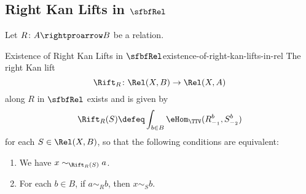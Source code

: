 \subsection{Right Kan Lifts in $\sfbfRel$}\label{subsection-right-kan-lifts-in-rel}
Let $R\colon A\rightproarrow B$ be a relation.
\begin{proposition}{Existence of Right Kan Lifts in $\sfbfRel$}{existence-of-right-kan-lifts-in-rel}%
    The right Kan lift
    \[
        \Rift_{R}%
        \colon%
        \Rel(X,B)%
        \to%
        \Rel(X,A)%
    \]%
    along $R$ in $\sfbfRel$ exists and is given by
    \[
        \Rift_{R}(S)%
        \defeq%
        \int_{b\in B}\eHom_{\TTV}(R^{b}_{-_{1}},S^{b}_{-_{2}})
    \]%
    for each $S\in\Rel(X,B)$, so that the following conditions are equivalent:
    \begin{enumerate}%
        \item We have $x\sim_{\Rift_{R}(S)}a$.
        \item For each $b\in B$, if $a\sim_{R}b$, then $x\sim_{S}b$.
    \end{enumerate}%
\end{proposition}
